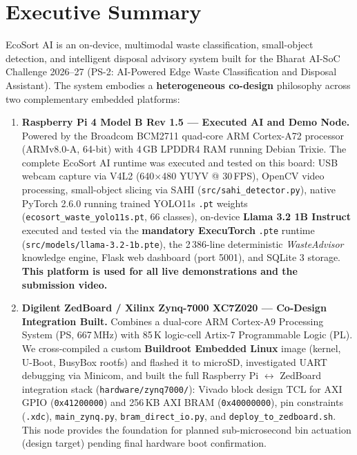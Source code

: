 \documentclass[12pt,a4paper]{article}
\begin{document}
\clearpage

\tableofcontents
\clearpage

\listoftables
{}
\clearpage

\section*{Executive Summary}

EcoSort AI is an on-device, multimodal waste classification, small-object detection, and
intelligent disposal advisory system built for the Bharat AI-SoC Challenge 2026--27
(PS-2: AI-Powered Edge Waste Classification and Disposal Assistant). The system embodies a
\textbf{heterogeneous co-design} philosophy across two complementary embedded platforms:

\begin{enumerate}[label=\textbf{\arabic*.}, leftmargin=*, itemsep=6pt]
  \item \textbf{Raspberry Pi 4 Model B Rev 1.5 --- Executed AI and Demo Node.}
  Powered by the Broadcom BCM2711 quad-core ARM Cortex-A72 processor (ARMv8.0-A,
  64-bit) with 4\,GB LPDDR4 RAM running Debian Trixie. The complete EcoSort AI runtime
  was executed and tested on this board: USB webcam capture via V4L2 (640$\times$480
  YUYV @ 30\,FPS), OpenCV video processing, small-object slicing via SAHI
  (\texttt{src/sahi\_detector.py}), native PyTorch 2.6.0 running trained YOLO11s
  \texttt{.pt} weights (\texttt{ecosort\_waste\_yolo11s.pt}, 66 classes), on-device
  \textbf{Llama 3.2 1B Instruct} executed and tested via the \textbf{mandatory ExecuTorch}
  \texttt{.pte} runtime (\texttt{src/models/llama-3.2-1b.pte}), the 2\,386-line
  deterministic \textit{WasteAdvisor} knowledge engine, Flask web dashboard (port 5001),
  and SQLite 3 storage. \textbf{This platform is used for all live demonstrations and the
  submission video.}

  \item \textbf{Digilent ZedBoard / Xilinx Zynq-7000 XC7Z020 --- Co-Design Integration Built.}
  Combines a dual-core ARM Cortex-A9 Processing System (PS, 667\,MHz) with 85\,K logic-cell
  Artix-7 Programmable Logic (PL). We cross-compiled a custom \textbf{Buildroot Embedded
  Linux} image (kernel, U-Boot, BusyBox rootfs) and flashed it to microSD, investigated UART
  debugging via Minicom, and built the full Raspberry Pi $\leftrightarrow$ ZedBoard
  integration stack (\texttt{hardware/zynq7000/}): Vivado block design TCL for AXI GPIO
  (\texttt{0x41200000}) and 256\,KB AXI BRAM (\texttt{0x40000000}), pin constraints
  (\texttt{.xdc}), \texttt{main\_zynq.py}, \texttt{bram\_direct\_io.py}, and
  \texttt{deploy\_to\_zedboard.sh}. This node provides the foundation for planned
  sub-microsecond bin actuation (design target) pending final hardware boot confirmation.
\end{enumerate}
\end{document}
